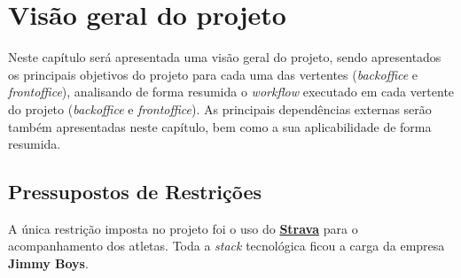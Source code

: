 \chapter{Visão geral do projeto}

Neste capítulo será apresentada uma visão geral do projeto, sendo apresentados os principais objetivos do projeto para cada uma das vertentes (\textit{backoffice} e \textit{frontoffice}), analisando de forma resumida o \textit{workflow} executado em cada vertente do projeto (\textit{backoffice} e \textit{frontoffice}). As principais dependências externas serão também apresentadas neste capítulo, bem como a sua aplicabilidade de forma resumida.





\section{Pressupostos de Restrições}

A única restrição imposta no projeto foi o uso do \textbf{\href{https://www.strava.com/?hl=pt-PT}{Strava}} para o acompanhamento dos atletas. Toda a \textit{stack} tecnológica ficou a carga da empresa \textbf{Jimmy Boys}.

